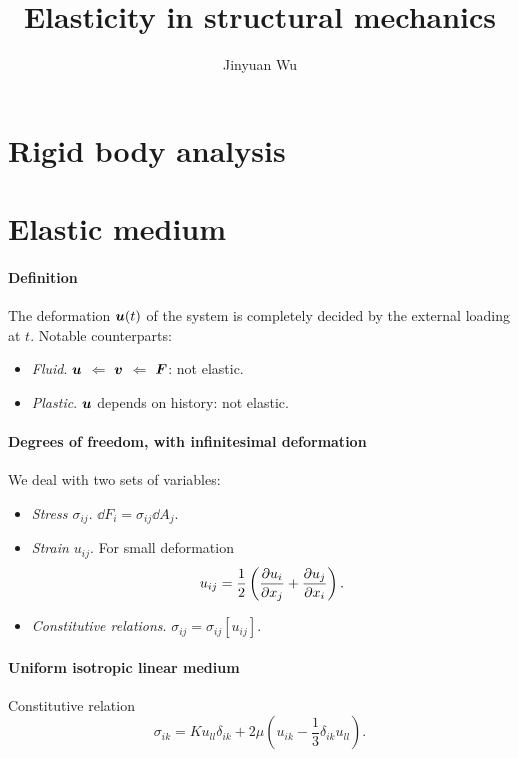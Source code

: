\documentclass[hyperref, a4paper]{article}
\title{Elasticity in structural mechanics}
\author{Jinyuan Wu}
\begin{document}
\maketitle

\section{Rigid body analysis}

\section{Elastic medium}

\paragraph*{Definition} The deformation $\vb*{u}(t)$ of the system 
is completely decided by the external loading at $t$.
Notable counterparts:
\begin{itemize}
    \item \emph{Fluid}. $\vb*{u}$ $\Leftarrow$ $\vb*{v}$ $\Leftarrow$ $\vb*{F}$: not elastic.
    \item \emph{Plastic}. $\vb*{u}$ depends on history: not elastic.
\end{itemize}

\paragraph*{Degrees of freedom, with infinitesimal deformation} We deal with two sets of variables:
\begin{itemize}
    \item \emph{Stress $\sigma_{ij}$}. $\dd{F}_i = \sigma_{ij} \dd{A}_j$.
    \item \emph{Strain $u_{ij}$}. For small deformation
    \begin{equation}
        u_{ij} = \frac{1}{2} \left(
            \pdv{u_i}{x_j} + \pdv{u_j}{x_i}
        \right).
    \end{equation}
    \item \emph{Constitutive relations}. $\sigma_{ij} = \sigma_{ij}[u_{ij}]$.
\end{itemize}

\paragraph*{Uniform isotropic linear medium} Constitutive relation  
\begin{equation}
    \sigma_{ik} = K u_{ll} \delta_{ik}
    + 2 \mu \left(
        u_{ik} - \frac{1}{3} \delta_{ik} u_{ll}
    \right).
    \label{eq:constitutive-relation}
\end{equation}
\end{document}
